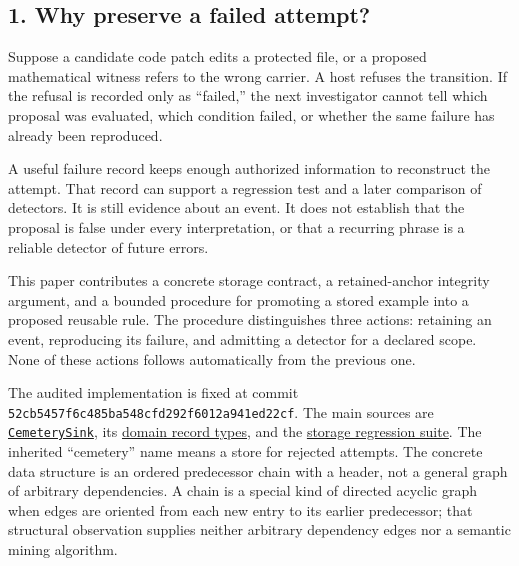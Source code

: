 \documentclass[
  11pt,
]{article}
\newcommand{\passthrough}[1]{#1}
\begin{document}
\hypertarget{why-preserve-a-failed-attempt}{%
\subsection{1. Why preserve a failed
attempt?}\label{why-preserve-a-failed-attempt}}

Suppose a candidate code patch edits a protected file, or a proposed
mathematical witness refers to the wrong carrier. A host refuses the
transition. If the refusal is recorded only as ``failed,'' the next
investigator cannot tell which proposal was evaluated, which condition
failed, or whether the same failure has already been reproduced.

A useful failure record keeps enough authorized information to
reconstruct the attempt. That record can support a regression test and a
later comparison of detectors. It is still evidence about an event. It
does not establish that the proposal is false under every
interpretation, or that a recurring phrase is a reliable detector of
future errors.

This paper contributes a concrete storage contract, a retained-anchor
integrity argument, and a bounded procedure for promoting a stored
example into a proposed reusable rule. The procedure distinguishes three
actions: retaining an event, reproducing its failure, and admitting a
detector for a declared scope. None of these actions follows
automatically from the previous one.

The audited implementation is fixed at commit
\texttt{\nolinkurl{52cb5457f6c485ba548cfd292f6012a941ed22cf}}. The
main sources are
\href{https://github.com/dbccpage/the_symbol_game/blob/52cb5457f6c485ba548cfd292f6012a941ed22cf/symbol_game/infrastructure/persistence/cemetery_sink.py}{\passthrough{\lstinline!CemeterySink!}},
its
\href{https://github.com/dbccpage/the_symbol_game/blob/52cb5457f6c485ba548cfd292f6012a941ed22cf/symbol_game/domain/entities/cemetery_entry.py}{domain
record types}, and the
\href{https://github.com/dbccpage/the_symbol_game/blob/52cb5457f6c485ba548cfd292f6012a941ed22cf/symbol_game/tests/test_cemetery_sink.py}{storage
regression suite}. The inherited ``cemetery'' name means a store for
rejected attempts. The concrete data structure is an ordered predecessor
chain with a header, not a general graph of arbitrary dependencies. A
chain is a special kind of directed acyclic graph when edges are
oriented from each new entry to its earlier predecessor; that structural
observation supplies neither arbitrary dependency edges nor a semantic
mining algorithm.
\end{document}
